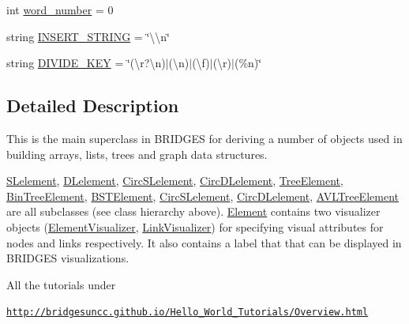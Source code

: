 \begin{DoxyCompactItemize}
\item 
int \mbox{\hyperlink{class_bridges_1_1_element_1_1_element_a857960f476b18de30baa18ae54877672}{word\+\_\+number}} = 0
\item 
string \mbox{\hyperlink{class_bridges_1_1_element_1_1_element_ab39bc7d8e0dc982c771602c6488f691e}{I\+N\+S\+E\+R\+T\+\_\+\+S\+T\+R\+I\+NG}} = \char`\"{}\textbackslash{}\textbackslash{}n\char`\"{}
\item 
string \mbox{\hyperlink{class_bridges_1_1_element_1_1_element_a73062c7f01d5cbac8f1ea19095904cda}{D\+I\+V\+I\+D\+E\+\_\+\+K\+EY}} = \char`\"{}(\textbackslash{}r?\textbackslash{}n)$\vert$(\textbackslash{}n)$\vert$(\textbackslash{}f)$\vert$(\textbackslash{}r)$\vert$(\%n)\char`\"{}
\end{DoxyCompactItemize}


\subsection{Detailed Description}
This is the main superclass in B\+R\+I\+D\+G\+ES for deriving a number of objects used in building arrays, lists, trees and graph data structures. 

\mbox{\hyperlink{namespace_bridges_1_1_s_lelement}{S\+Lelement}}, \mbox{\hyperlink{namespace_bridges_1_1_d_lelement}{D\+Lelement}}, \mbox{\hyperlink{namespace_bridges_1_1_circ_s_lelement}{Circ\+S\+Lelement}}, \mbox{\hyperlink{namespace_bridges_1_1_circ_d_lelement}{Circ\+D\+Lelement}}, \mbox{\hyperlink{namespace_bridges_1_1_tree_element}{Tree\+Element}}, \mbox{\hyperlink{namespace_bridges_1_1_bin_tree_element}{Bin\+Tree\+Element}}, \mbox{\hyperlink{namespace_bridges_1_1_b_s_t_element}{B\+S\+T\+Element}}, \mbox{\hyperlink{namespace_bridges_1_1_circ_s_lelement}{Circ\+S\+Lelement}}, \mbox{\hyperlink{namespace_bridges_1_1_circ_d_lelement}{Circ\+D\+Lelement}}, \mbox{\hyperlink{namespace_bridges_1_1_a_v_l_tree_element}{A\+V\+L\+Tree\+Element}} are all subclasses (see class hierarchy above). \mbox{\hyperlink{class_bridges_1_1_element_1_1_element}{Element}} contains two visualizer objects (\mbox{\hyperlink{namespace_bridges_1_1_element_visualizer}{Element\+Visualizer}}, \mbox{\hyperlink{namespace_bridges_1_1_link_visualizer}{Link\+Visualizer}}) for specifying visual attributes for nodes and links respectively. It also contains a label that that can be displayed in B\+R\+I\+D\+G\+ES visualizations.

All the tutorials under

\href{http://bridgesuncc.github.io/Hello_World_Tutorials/Overview.html}{\tt http\+://bridgesuncc.\+github.\+io/\+Hello\+\_\+\+World\+\_\+\+Tutorials/\+Overview.\+html}

